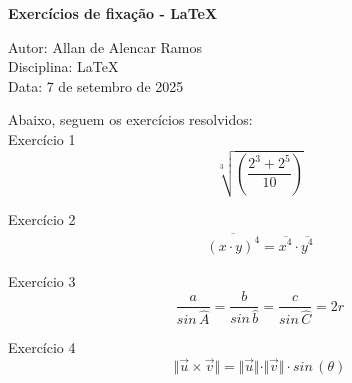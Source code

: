 \documentclass[12pt, a4paper]{article}
\begin{document}
\begin{center}
	\textbf{\large Exercícios de fixação - LaTeX}
\end{center}

\vspace{0.25cm}

\begin{flushleft}
Autor: Allan de Alencar Ramos \\
Disciplina: LaTeX \\
Data: 7 de setembro de 2025
\end{flushleft}

Abaixo, seguem os exercícios resolvidos: \\

Exercício 1 \\
\begin{equation}
\sqrt[3]{ \left(\frac{ 2^{3} + 2^{5} }{10}\right) }
\end{equation}

Exercício 2 \\
\begin{eqnarray}
\overline{ (x \cdot y)^{4} } = \overline{x^{4}} \cdot \overline{y^{4}}
\end{eqnarray}

Exercício 3 \\
\begin{equation}
\frac{a}{sin \, \widehat{A}} = 
\frac{b}{sin \, \widehat{b}} = 
\frac{c}{sin \, \widehat{C}} = 2r
\end{equation}

Exercício 4 \\
\begin{equation}
\Vert \vec{u} \times \vec{v} \Vert = 
\Vert \vec{u} \Vert \cdot
\Vert \vec{v} \Vert \cdot
sin \, (\theta)
\end{equation}
\end{document}
